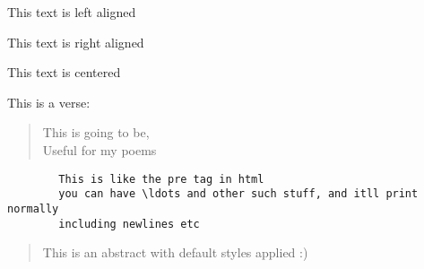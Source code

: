 \documentclass[a4paper,12pt,titlepage]{article} %
\begin{document}
	\begin{flushleft}
		This text is left aligned
	\end{flushleft}

	\begin{flushright}
		This text is right aligned
	\end{flushright}		
	
	\begin{center}
		This text is centered
	\end{center}		
	
	This is a verse:
	\begin{verse}
		This is going to be,\\
		Useful for my poems
	\end{verse}
	

	\begin{verbatim}
		This is like the pre tag in html
		you can have \ldots and other such stuff, and itll print normally
		including newlines etc
	\end{verbatim}
	
	\begin{abstract}
		This is an abstract with default styles applied :)
	\end{abstract}
		
\end{document}
